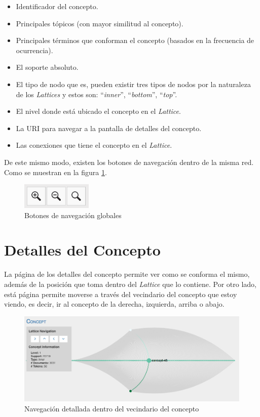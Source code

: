 \documentclass[12pt,oneside,letterpaper]{book}
\newcommand{\eng}[1]{\textit{#1}\xspace}			%
\theoremstyle{definition}
\begin{document}
\begin{itemize}
	\item Identificador del concepto.
	\item Principales tópicos (con mayor similitud al concepto).
	\item Principales términos que conforman el concepto (basados en la frecuencia de ocurrencia).
	\item El soporte absoluto.
	\item El tipo de nodo que es, pueden existir tres tipos de nodos por la naturaleza de los \eng{Lattices} y estos son: ``\eng{inner}'', ``\eng{bottom}'', ``\eng{top}''.
	\item El nivel donde está ubicado el concepto en el \eng{Lattice}.
	\item La URI para navegar a la pantalla de detalles del concepto.
	\item Las conexiones que tiene el concepto en el \eng{Lattice}.
\end{itemize}

De este mismo modo, existen los botones de navegación dentro de la misma red. Como se muestran en la figura \ref{fig:results_5}.
\begin{figure}[h!]
	\centering
	\includegraphics[width=0.3\textwidth]{images/results_5.png}
	\caption{Botones de navegación globales}
	\label{fig:results_5}
\end{figure}


\section{Detalles del Concepto}
La página de los detalles del concepto permite ver como se conforma el mismo, además de la posición que toma dentro del \eng{Lattice} que lo contiene. Por otro lado, está página permite moverse a través del vecindario del concepto que estoy viendo, es decir, ir al concepto de la derecha, izquierda, arriba o abajo.

\begin{figure}[h!]
	\centering
	\includegraphics[width=1\textwidth]{images/results_6.png}
	\caption{Navegación detallada dentro del vecindario del concepto}
	\label{fig:results_6}
\end{figure}
\end{document}
